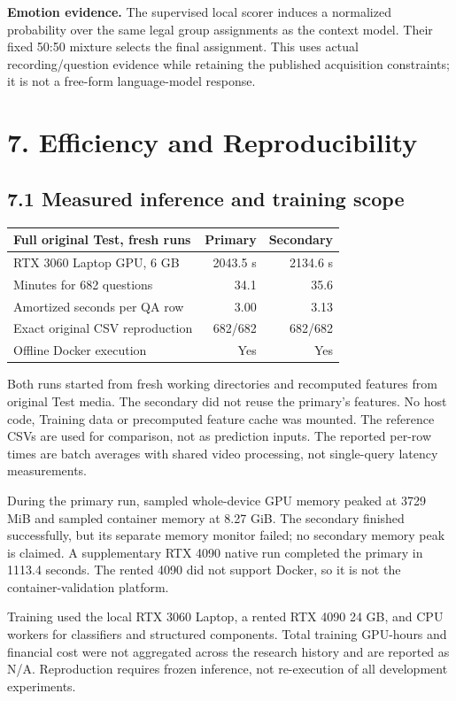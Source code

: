 \documentclass[12pt,a4paper]{article}
\newcommand{\pageheading}[1]{\vspace*{-5pt}\section*{#1}}
\begin{document}
\textbf{Emotion evidence.} The supervised local scorer induces a normalized probability over the same legal group assignments as the context model. Their fixed 50:50 mixture selects the final assignment. This uses actual recording/question evidence while retaining the published acquisition constraints; it is not a free-form language-model response.

\pageheading{7. Efficiency and Reproducibility}
\subsection*{7.1 Measured inference and training scope}
\begin{tabularx}{\linewidth}{@{}Yrr@{}}
\toprule
Full original Test, fresh runs & Primary & Secondary\\
\midrule
RTX 3060 Laptop GPU, 6 GB & 2043.5 s & 2134.6 s\\
Minutes for 682 questions & 34.1 & 35.6\\
Amortized seconds per QA row & 3.00 & 3.13\\
Exact original CSV reproduction & 682/682 & 682/682\\
Offline Docker execution & Yes & Yes\\
\bottomrule
\end{tabularx}

Both runs started from fresh working directories and recomputed features from original Test media. The secondary did not reuse the primary's features. No host code, Training data or precomputed feature cache was mounted. The reference CSVs are used for comparison, not as prediction inputs. The reported per-row times are batch averages with shared video processing, not single-query latency measurements.

During the primary run, sampled whole-device GPU memory peaked at 3729 MiB and sampled container memory at 8.27 GiB. The secondary finished successfully, but its separate memory monitor failed; no secondary memory peak is claimed. A supplementary RTX 4090 native run completed the primary in 1113.4 seconds. The rented 4090 did not support Docker, so it is not the container-validation platform.

Training used the local RTX 3060 Laptop, a rented RTX 4090 24 GB, and CPU workers for classifiers and structured components. Total training GPU-hours and financial cost were not aggregated across the research history and are reported as N/A. Reproduction requires frozen inference, not re-execution of all development experiments.
\end{document}
